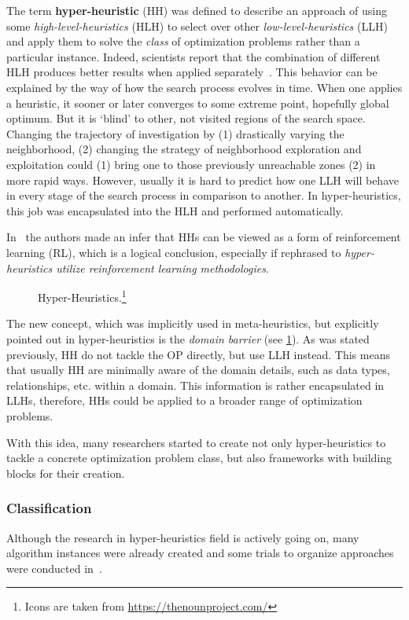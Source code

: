 The term \textbf{hyper-heuristic} (HH) was defined to describe an approach of using some \textit{high-level-heuristics} (HLH) to select over other \textit{low-level-heuristics} (LLH) and apply them to solve the \textit{class} of optimization problems rather than a particular instance. Indeed, scientists report that the combination of different HLH produces better results when applied separately~\cite{drake2019recent}.
This behavior can be explained by the way of how the search process evolves in time. When one applies a heuristic, it sooner or later converges to some extreme point, hopefully global optimum. But it is `blind' to other, not visited regions of the search space. Changing the trajectory of investigation by (1) drastically varying the neighborhood, (2) changing the strategy of neighborhood exploration and exploitation could (1) bring one to those previously unreachable zones (2) in more rapid ways. However, usually it is hard to predict how one LLH will behave in every stage of the search process in comparison to another. In hyper-heuristics, this job was encapsulated into the HLH and performed automatically. 

In~\cite{moriarty1999evolutionary} the authors made an infer that HHs can be viewed as a form of reinforcement learning (RL), which is a logical conclusion, especially if rephrased to \textit{hyper-heuristics utilize reinforcement learning methodologies}.

\begin{figure}
	\raggedleft
	
	\caption[Hyper-Heuristics]{Hyper-Heuristics.\footnote{Icons are taken from \url{https://thenounproject.com/}}}
	\label{bg:pic:HH}
\end{figure}

The new concept, which was implicitly used in meta-heuristics, but explicitly pointed out in hyper-heuristics is the \emph{domain barrier} (see \cref{bg:pic:HH}).
As was stated previously, HH do not tackle the OP directly, but use LLH instead. This means that usually HH are minimally aware of the domain details, such as data types, relationships, etc. within a domain. This information is rather encapsulated in LLHs, therefore, HHs could be applied to a broader range of optimization problems.

With this idea, many researchers started to create not only hyper-heuristics to tackle a concrete optimization problem class, but also frameworks with building blocks for their creation.


\subsubsection{Classification}
Although the research in hyper-heuristics field is actively going on, many algorithm instances were already created and some trials to organize approaches were conducted in~\cite{ryser2014review,drake2019recent,burke2019classification,kerschke2019automated}.

